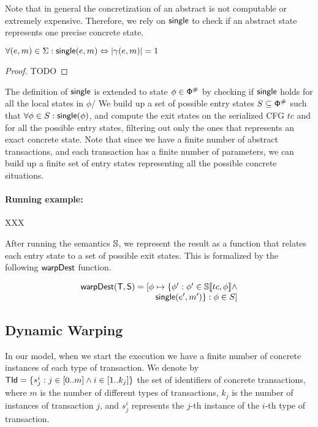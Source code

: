 Note that in general the concretization of an abstract is not computable or extremely expensive. Therefore, we rely on $\mathsf{single}$ to check if an abstract state represents one precise concrete state.

\begin{lemma}
	$\forall (e, m) \in \Sigma : \mathsf{single}(e, m) \Leftrightarrow |\gamma(e, m)|=1$
\end{lemma}
\begin{proof}
	TODO
\end{proof}

The definition of $\mathsf{single}$ is extended to state $\phi \in \mathsf{\mathsf{\Phi}}^\#$ by checking if $\mathsf{single}$ holds for all the local states in $\phi$/
We build up a set of possible entry states $S \subseteq \mathsf{\mathsf{\Phi}}^\#$ such that $\forall \phi \in S : \mathsf{single}(\phi)$, and compute the exit states on the serialized CFG $tc$ and for all the possible entry states, filtering out only the ones that represents an exact concrete state. Note that since we have a finite number of abstract transactions, and each transaction has a finite number of parameters, we can build up a finite set of entry states representing all the possible concrete situations.

\paragraph{Running example:} XXX


After running the semantics $\mathbb{S}$, we represent the result as a function that relates each entry state to a set of possible exit states. This is formalized by the following $\mathsf{warpDest}$ function.


\[
\begin{array}{r}
\mathsf{warpDest}(\mathsf{T}, \mathsf{S}) =[\phi \mapsto \{ \phi': \phi' \in \mathbb{S}\llbracket tc, \phi \rrbracket \land\\
\mathsf{single}(e', m')\} : \phi \in S]\\
\end{array}
\]

\subsection{Dynamic Warping}

In our model, when we start the execution we have a finite number of concrete instances of each type of transaction. We denote by $\mathsf{TId} = \{s^i_j : j \in [0..m] \land i \in [1..k_j]\}$ the set of identifiers of concrete transactions, where $m$ is the number of different types of transactions, $k_j$ is the number of instances of transaction $j$, and $s^i_j$ represents the $j$-th instance of the $i$-th type of transaction.

